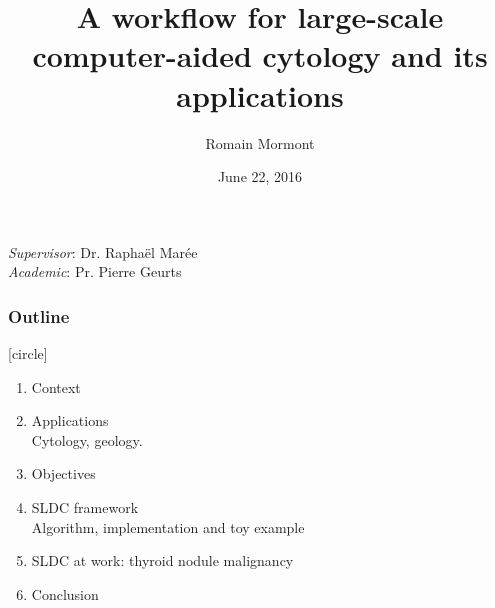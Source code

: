 \documentclass{beamer}
\title{{\bf A workflow for large-scale computer-aided cytology and its applications}}
\author{Romain Mormont}
\institute{Université de Liège, Belgium}
\date{June 22, 2016}
\begin{document}
\renewcommand{\inserttotalframenumber}{28}


\begin{frame}
\titlepage
\begin{center}
	\footnotesize
	\textit{Supervisor}: Dr. Raphaël Marée\\
	\textit{Academic}: Pr. Pierre Geurts
\end{center}
\end{frame}

\begin{frame}
  \frametitle{Outline}
  [circle]
  \begin{enumerate}
  \item Context

  \vspace{0.5cm}

  \item Applications\\
    {\scriptsize Cytology, geology.}

  \vspace{0.5cm}
  
  \item Objectives

  \vspace{0.5cm}

  \item SLDC framework\\
    {\scriptsize Algorithm, implementation and toy example}
	
  \vspace{0.5cm}

  \item SLDC at work: thyroid nodule malignancy

  \vspace{0.5cm}

  \item Conclusion 
  \end{enumerate}
\end{frame}


\end{document}
